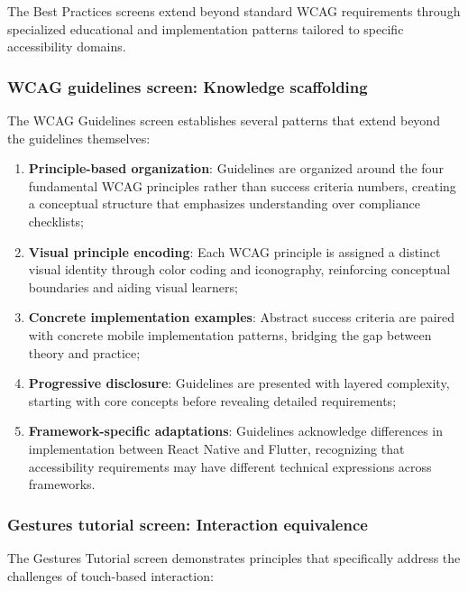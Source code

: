 The Best Practices screens extend beyond standard WCAG requirements through specialized educational and implementation patterns tailored to specific accessibility domains.

\subsubsection{WCAG guidelines screen: Knowledge scaffolding}

The WCAG Guidelines screen establishes several patterns that extend beyond the guidelines themselves:

\begin{enumerate}
    \item \textbf{Principle-based organization}: Guidelines are organized around the four fundamental WCAG principles rather than success criteria numbers, creating a conceptual structure that emphasizes understanding over compliance checklists;
    
    \item \textbf{Visual principle encoding}: Each WCAG principle is assigned a distinct visual identity through color coding and iconography, reinforcing conceptual boundaries and aiding visual learners;
    
    \item \textbf{Concrete implementation examples}: Abstract success criteria are paired with concrete mobile implementation patterns, bridging the gap between theory and practice;
    
    \item \textbf{Progressive disclosure}: Guidelines are presented with layered complexity, starting with core concepts before revealing detailed requirements;
    
    \item \textbf{Framework-specific adaptations}: Guidelines acknowledge differences in implementation between React Native and Flutter, recognizing that accessibility requirements may have different technical expressions across frameworks.
\end{enumerate}

\subsubsection{Gestures tutorial screen: Interaction equivalence}

The Gestures Tutorial screen demonstrates principles that specifically address the challenges of touch-based interaction:

